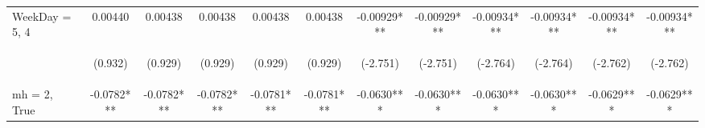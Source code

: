 \documentclass[]{article}
\begin{document}
\begin{center}
\begin{tabular}{lccccccccccc}
WeekDay = 5, 4 & 0.00440 & 0.00438 & 0.00438 & 0.00438 & 0.00438 & -0.00929*** & -0.00929*** & -0.00934*** & -0.00934*** & -0.00934*** & -0.00934*** \\
\vspace{4pt} & \begin{footnotesize}(0.932)\end{footnotesize} & \begin{footnotesize}(0.929)\end{footnotesize} & \begin{footnotesize}(0.929)\end{footnotesize} & \begin{footnotesize}(0.929)\end{footnotesize} & \begin{footnotesize}(0.929)\end{footnotesize} & \begin{footnotesize}(-2.751)\end{footnotesize} & \begin{footnotesize}(-2.751)\end{footnotesize} & \begin{footnotesize}(-2.764)\end{footnotesize} & \begin{footnotesize}(-2.764)\end{footnotesize} & \begin{footnotesize}(-2.762)\end{footnotesize} & \begin{footnotesize}(-2.762)\end{footnotesize} \\
mh = 2, True & -0.0782*** & -0.0782*** & -0.0782*** & -0.0781*** & -0.0781*** & -0.0630*** & -0.0630*** & -0.0630*** & -0.0630*** & -0.0629*** & -0.0629*** \\

\end{tabular}
\end{center}
\end{document}
